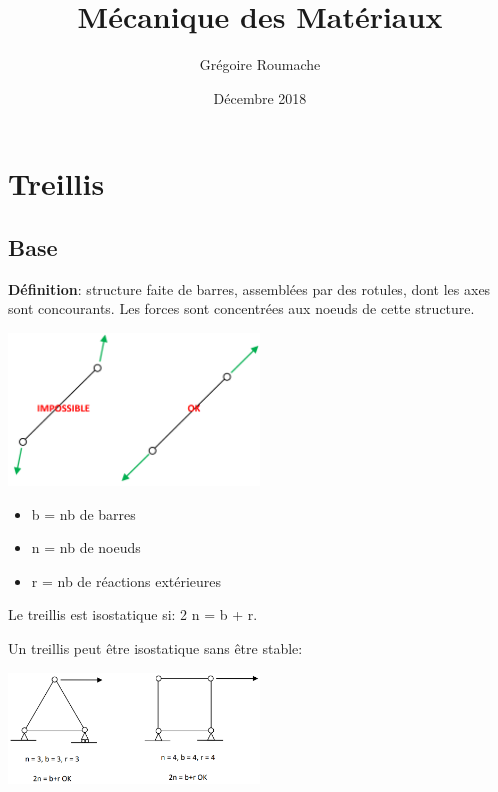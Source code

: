 \documentclass[a4paper]{article}
\title{Mécanique des Matériaux}
\author{Grégoire Roumache}
\date{Décembre 2018}
\begin{document}
\maketitle


\tableofcontents





\section{Treillis}





\subsection{Base}





\textbf{Définition}: structure faite de barres, assemblées par des rotules, dont les axes sont concourants. Les forces sont concentrées aux noeuds de cette structure.

\begin{center} \includegraphics[width=0.5\textwidth]{images/Treillis01.PNG} \end{center}

\begin{itemize}

    \item b = nb de barres
    \item n = nb de noeuds
    \item r = nb de réactions extérieures

\end{itemize}

Le treillis est isostatique si: 2 n = b + r.

Un treillis peut être isostatique sans être stable:

\begin{center} \includegraphics[width=0.5\textwidth]{images/Treillis02.PNG} \end{center}
\end{document}
